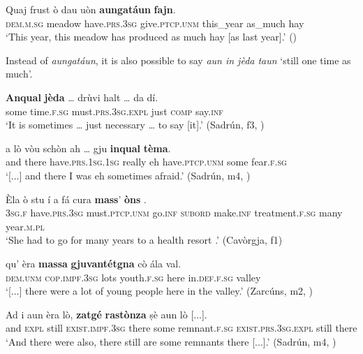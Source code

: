 \ea\label{ex:aungataun1}
\gll  Quaj frust ò dau uòn \textbf{aungatáun} \textbf{fajn}. \\
\textsc{dem.m.sg} meadow have.\textsc{prs.3sg} give.\textsc{ptcp.unm} this\_year as\_much hay \\
\glt `This year, this meadow has produced as much hay [as last year].' ()
\z

Instead of \textit{aungatáun}, it is also possible to say \textit{aun in jèda taun} `still one time as much'.

\ea
\label{ex:anqual1}
\gll  \textbf{Anqual} \textbf{jèda} … drùvi halt … da dí.\\
some time.\textsc{f.sg} {} must.\textsc{prs.3sg.expl} just {} \textsc{comp} say.\textsc{inf}\\
\glt `It is sometimes … just necessary … to say [it].' (Sadrún, f3, )
\z

\ea
\label{ex:anqual2}
\gll  [...] a lò vòu schòn ah … gju \textbf{inqual} \textbf{tèma}.  \\
{} and there have.\textsc{prs.1sg.1sg} really eh {} have.\textsc{ptcp.unm} some fear.\textsc{f.sg} \\
\glt `[...] and there I was eh sometimes afraid.' (Sadrún, m4, )
\z

\ea
\label{ex:massa1}
\gll  Èla ò stu í a fá cura \textbf{mass}’ \textbf{òns} .\\
\textsc{3sg.f}  have.\textsc{prs.3sg} must.\textsc{ptcp.unm} go.\textsc{inf} \textsc{subord} make.\textsc{inf} treatment.\textsc{f.sg} many year.\textsc{m.pl}\\
\glt `She had to go for many years to a health resort .' (Cavòrgja, f1)
\z

\ea
\label{ex:massa2}
\gll    [...] qu’ èra \textbf{massa} \textbf{gjuvantétgna} cò ála val. \\
{} \textsc{dem.unm} \textsc{cop.impf.3sg} lots youth.\textsc{f.sg}  here in.\textsc{def.f.sg} valley\\
\glt `[...] there were a lot of young people here in the valley.' (Zarcúns, m2, )
\z

\ea
\label{ex:zatge1}
\gll Ad i aun èra lò, \textbf{zatgé} \textbf{rastònza} ṣè aun lò [...].\\
and \textsc{expl} still \textsc{exist.impf.3sg} there some remnant.\textsc{f.sg} \textsc{exist.prs.3sg.expl} still there\\
\glt `And there were also, there still are some remnants there [...].' (Sadrún, m4, )
\z

